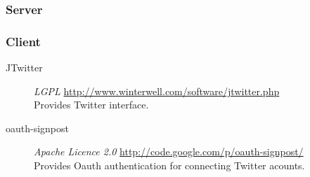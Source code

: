 \subsubsection{Server}


\subsubsection{Client}

\begin{description}
    \item[JTwitter] \emph{LGPL} \url{http://www.winterwell.com/software/jtwitter.php} \hfill \\
        Provides Twitter interface.
    \item[oauth-signpost] \emph{Apache Licence 2.0} \url{http://code.google.com/p/oauth-signpost/} \hfill \\
        Provides Oauth authentication for connecting Twitter acounts.
\end{description}

